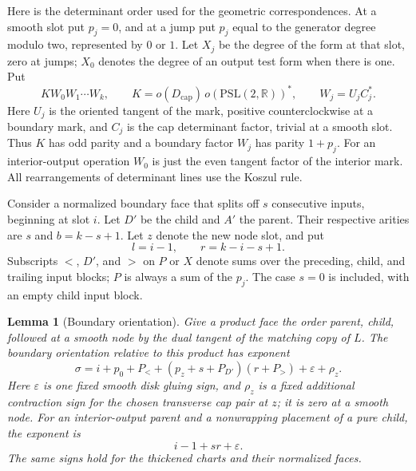 \documentclass[11pt]{article}
\newtheorem{lemma}[theorem]{Lemma}
\theoremstyle{definition}
\theoremstyle{remark}
\numberwithin{equation}{section}
\begin{document}
Here is the determinant order used for the geometric correspondences.
At a smooth slot put $p_j=0$, and at a jump put $p_j$ equal to the
generator degree modulo two, represented by $0$ or $1$.  Let $X_j$ be
the degree of the form at that slot, zero at jumps; $X_0$ denotes the
degree of an output test form when there is one.  Put
\begin{equation}
 \label{obs:determinant-order}
 K W_0W_1\cdots W_k,\qquad
 K=o(D_{\mathrm{cap}})\,o(\mathrm{PSL}(2,\mathbb R))^*,\qquad
 W_j=U_jC_j^*.
\end{equation}
Here $U_j$ is the oriented tangent of the mark, positive
counterclockwise at a boundary mark, and $C_j$ is the cap determinant
factor, trivial at a smooth slot.  Thus $K$ has odd parity and a
boundary factor $W_j$ has parity $1+p_j$.  For an interior-output
operation $W_0$ is just the even tangent factor of the interior mark.
All rearrangements of determinant lines use the Koszul rule.

Consider a normalized boundary face that splits off $s$ consecutive
inputs, beginning at slot $i$.  Let $D'$ be the child and $A'$ the
parent.  Their respective arities are $s$ and
$b=k-s+1$.  Let $z$ denote the new node slot, and put
\[
 l=i-1,\qquad r=k-i-s+1.
\]
Subscripts $<$, $D'$, and $>$ on $P$ or $X$ denote sums over the
preceding, child, and trailing input blocks; $P$ is always a sum of
the $p_j$.  The case $s=0$ is included, with an empty child input block.

\begin{lemma}[Boundary orientation]\label{obs:boundary-sign}
Give a product face the order parent, child, followed at a smooth node
by the dual tangent of the matching copy of $L$.  The boundary
orientation relative to this product has exponent
\begin{equation}
 \label{obs:boundary-exponent}
 \sigma=i+p_0+P_<+
       (p_z+s+P_{D'})(r+P_>)+\varepsilon+\rho_z.
\end{equation}
Here $\varepsilon$ is one fixed smooth disk gluing sign, and $\rho_z$
is a fixed additional contraction sign for the chosen transverse cap
pair at $z$; it is zero at a smooth node.  For an interior-output
parent and a nonwrapping placement of a pure child, the exponent is
\begin{equation}
 \label{obs:p-boundary-exponent}
 i-1+sr+\varepsilon.
\end{equation}
The same signs hold for the thickened charts and their normalized
faces.
\end{lemma}
\end{document}
